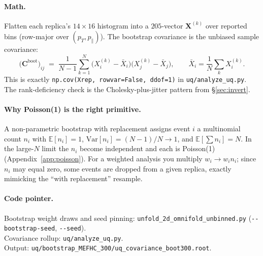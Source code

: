 \documentclass[12pt]{article}
\newcommand{\pT}{p_{T}}
\newcommand{\pPar}{p_{\parallel}}
\newcommand{\boot}{\text{boot}}
\begin{document}
\paragraph{Math.}
Flatten each replica's $14\times16$ histogram into a $205$-vector
$\mathbf{X}^{(k)}$ over reported bins (row-major over $(\pT,\pPar)$).
The bootstrap covariance is the unbiased sample covariance:
\begin{equation}
\big(\mathbf{C}^{\boot}\big)_{ij}
\;=\;
\frac{1}{N-1}\sum_{k=1}^{N}
\big(X_{i}^{(k)} - \bar X_{i}\big)\big(X_{j}^{(k)} - \bar X_{j}\big),
\qquad
\bar X_{i} = \frac{1}{N}\sum_{k} X_{i}^{(k)}.
\label{eq:bootcov}
\end{equation}
This is exactly \texttt{np.cov(Xrep, rowvar=False, ddof=1)} in
\texttt{uq/analyze\_uq.py}. The rank-deficiency check is the
Cholesky-plus-jitter pattern from \S\ref{sec:invert}.

\paragraph{Why Poisson(1) is the right primitive.}
A non-parametric bootstrap with replacement assigns event $i$ a
multinomial count $n_{i}$ with $\mathbb{E}[n_{i}]=1$,
$\mathrm{Var}[n_{i}] = (N-1)/N \to 1$, and $\mathbb{E}[\sum n_{i}] =
N$. In the large-$N$ limit the $n_{i}$ become independent and each is
Poisson(1) (Appendix~\ref{app:poisson}). For a weighted analysis you
multiply $w_{i}\to w_{i}n_{i}$; since $n_{i}$ may equal zero,
some events are dropped from a given replica, exactly mimicking the
``with replacement'' resample.

\paragraph{Code pointer.}
Bootstrap weight draws and seed pinning:
\texttt{unfold\_2d\_omnifold\_unbinned.py} (\texttt{-{}-bootstrap-seed},
\texttt{-{}-seed}).\\
Covariance rollup: \texttt{uq/analyze\_uq.py}.\\
Output: \texttt{uq/bootstrap\_MEFHC\_300/uq\_covariance\_boot300.root}.
\end{document}

